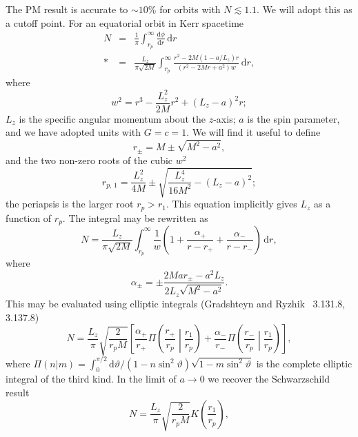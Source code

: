 \documentclass[aps,prd,amsfonts,amssymb,amsmath,nofootinbib,floatfix,reprint,showpacs,groupedaddress]{revtex4-1}
\newcommand{\dd}{\ensuremath{\mathrm{d}}}
\newcommand{\diff}[2]{\ensuremath{\frac{\dd {#1}}{\dd {#2}}}}
\newcommand{\intd}[4]{\ensuremath{\int_{#1}^{#2}{#3}\,\dd{#4}}}
\newcommand{\recip}[1]{\ensuremath{\frac{1}{#1}}}
\begin{document}
The PM result is accurate to $\sim 10\%$ for orbits with $N \lesssim 1.1$. We will adopt this as a cutoff point. For an equatorial orbit in Kerr spacetime
\begin{eqnarray}
N & = & \recip{\pi}\intd{r_{p}}{\infty}{\diff{\phi}{r}}{r} \nonumber \\*
 & = & \frac{L_z}{\pi\sqrt{2M}}\intd{r_{p}}{\infty}{\frac{r^2 - 2M(1 - a/L_z)r}{(r^2 - 2Mr + a^2)w}}{r},
\end{eqnarray}
where
\begin{equation}
w^2 = r^3 - \frac{L_z^2}{2M}r^2 + (L_z - a)^2r;
\end{equation}
$L_z$ is the specific angular momentum about the $z$-axis; $a$ is the spin parameter, and we have adopted units with $G = c = 1$. We will find it useful to define
\begin{equation}
r_\pm = M \pm \sqrt{M^2 - a^2},
\end{equation}
and the two non-zero roots of the cubic $w^2$
\begin{equation}
r_{p,\,1} = \frac{L_z^2}{4M} \pm \sqrt{\frac{L_z^4}{16M^2} - (L_z -a)^2};
\end{equation}
the periapsis is the larger root $r_{p} > r_1$. This equation implicitly gives $L_z$ as a function of $r_p$. The integral may be rewritten as
\begin{equation}
N = \frac{L_z}{\pi\sqrt{2M}}\intd{r_{p}}{\infty}{\recip{w}\left(1 + \frac{\alpha_+}{r-r_+} + \frac{\alpha_-}{r-r_-}\right)}{r},
\end{equation}
where
\begin{equation}
\alpha_\pm = \pm\frac{2Mar_\pm - a^2L_z}{2L_z\sqrt{M^2-a^2}}.
\end{equation}
This may be evaluated using elliptic integrals (Gradshteyn and Ryzhik~\cite{Gradshteyn2000} 3.131.8, 3.137.8)
\begin{equation}
N = \frac{L_z}{\pi}\sqrt{\frac{2}{r_{p}M}}\left[\frac{\alpha_+}{r_+}\Pi\left(\frac{r_+}{r_{p}}\middle|\frac{r_1}{r_{p}}\right) + \frac{\alpha_-}{r_-}\Pi\left(\frac{r_-}{r_{p}}\middle|\frac{r_1}{r_{p}}\right)\right],
\end{equation}
where $\Pi(n|m) = \int_{0}^{\pi/2}{\dd\vartheta/(1-n\sin^2\vartheta)\sqrt{1-m\sin^2\vartheta}}$ is the complete elliptic integral of the third kind. In the limit of $a \rightarrow 0$ we recover the Schwarzschild result~\cite{Cutler1994}
\begin{equation}
N = \frac{L_z}{\pi}\sqrt{\frac{2}{r_{p}M}}K\left(\frac{r_1}{r_{p}}\right),
\end{equation}
\end{document}
